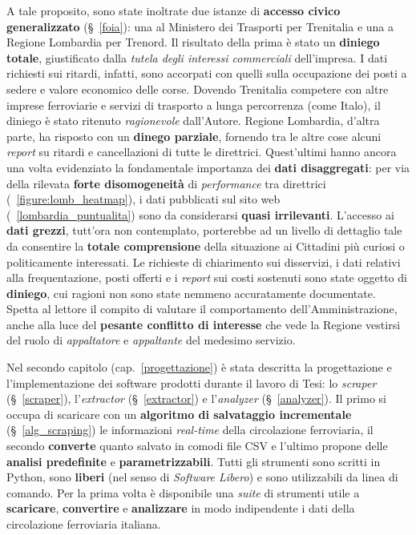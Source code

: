\documentclass[12pt,a4paper,italian]{report}
\begin{document}
A tale proposito, sono state inoltrate due istanze di \textbf{accesso
    civico generalizzato} (\S~\ref{foia}): una al Ministero dei
Trasporti per Trenitalia e una a Regione Lombardia per Trenord.  Il
risultato della prima è stato un \textbf{diniego totale}, giustificato
dalla \textit{tutela degli interessi commerciali} dell'impresa.  I
dati richiesti sui ritardi, infatti, sono accorpati con quelli sulla
occupazione dei posti a sedere e valore economico delle corse.
Dovendo Trenitalia competere con altre imprese ferroviarie e servizi
di trasporto a lunga percorrenza (come Italo), il diniego è stato
ritenuto \textit{ragionevole} dall'Autore.  Regione Lombardia, d'altra
parte, ha risposto con un \textbf{dinego parziale}, fornendo tra le
altre cose alcuni \textit{report} su ritardi e cancellazioni di tutte
le direttrici.  Quest'ultimi hanno ancora una volta evidenziato la
fondamentale importanza dei \textbf{dati disaggregati}: per via della
rilevata \textbf{forte disomogeneità} di \textit{performance} tra
direttrici (\figurename~\ref{figure:lomb_heatmap}), i dati pubblicati
sul sito web (\figurename~\ref{lombardia_puntualita}) sono da
considerarsi \textbf{quasi irrilevanti}.  L'accesso ai \textbf{dati
    grezzi}, tutt'ora non contemplato, porterebbe ad un livello di
dettaglio tale da consentire la \textbf{totale comprensione} della
situazione ai Cittadini più curiosi o politicamente interessati.  Le
richieste di chiarimento sui disservizi, i dati relativi alla
frequentazione, posti offerti e i \textit{report} sui costi sostenuti
sono state oggetto di \textbf{diniego}, cui ragioni non sono state
nemmeno accuratamente documentate.  Spetta al lettore il compito di
valutare il comportamento dell'Amministrazione, anche alla luce del
\textbf{pesante conflitto di interesse} che vede la Regione vestirsi
del ruolo di \textit{appaltatore} e \textit{appaltante} del medesimo
servizio.

Nel secondo capitolo (cap.\@~\ref{progettazione}) è stata descritta la
progettazione e l'implementazione dei software prodotti durante il
lavoro di Tesi: lo \textit{scraper} (\S~\ref{scraper}),
l'\textit{extractor} (\S~\ref{extractor}) e l'\textit{analyzer}
(\S~\ref{analyzer}).  Il primo si occupa di scaricare con un
\textbf{algoritmo di salvataggio incrementale} (\S~\ref{alg_scraping})
le informazioni \textit{real-time} della circolazione ferroviaria, il
secondo \textbf{converte} quanto salvato in comodi file CSV e l’ultimo
propone delle \textbf{analisi predefinite} e
\textbf{parametrizzabili}.  Tutti gli strumenti sono scritti in
Python, sono \textbf{liberi} (nel senso di \textit{Software Libero}) e sono utilizzabili da linea di
comando.  Per la prima volta è disponibile una \textit{suite} di
strumenti utile a \textbf{scaricare}, \textbf{convertire} e
\textbf{analizzare} in modo indipendente i dati della circolazione
ferroviaria italiana.
\end{document}
